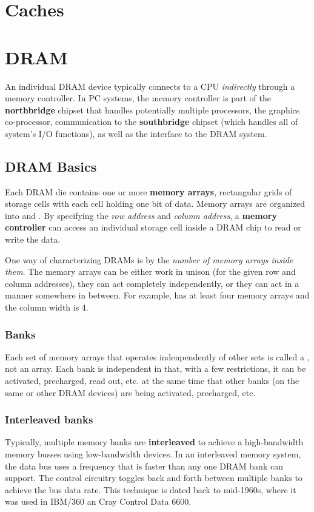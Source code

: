 \chapter{Caches}

\chapter{DRAM}
An individual DRAM device typically connects to a CPU {\em indirectly\/}
through a memory controller. In PC systems, the memory controller is part of
the {\bf northbridge} chipset that handles potentially multiple processors,
the graphics co-processor, communication to the {\bf southbridge} chipset
(which handles all of system's I/O functions), as well as the interface to the
DRAM system.  

\section{DRAM Basics}
Each DRAM die contains one or more {\bf memory arrays}, rectangular grids of
storage cells with each cell holding one bit of data. Memory arrays are
organized into  and . By specifying the {\em row
  address\/} and {\em column address\/}, a {\bf memory controller} can access
an individual storage cell inside a DRAM chip to read or write the data. 

One way of characterizing DRAMs is by the {\em number of memory arrays inside
  them\/}. The memory arrays can be either work in unison (for the given row
and column addresses), they can act completely independently, or they can
  act in a manner somewhere in between. For example,  has at least four memory arrays and the column width is 4. 

\subsection{Banks}
Each set of memory arrays that operates indenpendently of other sets is called
a , not an array. Each bank is independent in that, with a few
restrictions, it can be activated, precharged, read out, etc. at the same time
that other banks (on the same or other DRAM devices) are being activated,
precharged, etc. 

\subsection{Interleaved banks}
Typically, multiple memory banks are {\bf interleaved}  to
achieve a high-bandwidth memory busses using low-bandwidth devices. 
In an interleaved memory system, the data bus uses a frequency that is faster
than any one DRAM bank can support. The control circuitry toggles back and
forth between multiple banks to achieve the bus data rate. This technique is
dated back to mid-1960s, where it was used in IBM/360 an Cray Control Data
6600.  

